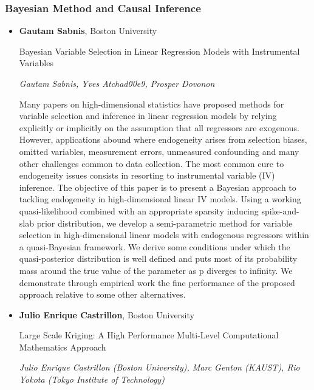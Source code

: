 \subsubsection*{Bayesian Method and Causal Inference}

\begin{itemize}
\item \textbf{Gautam Sabnis}, Boston University

Bayesian Variable Selection in Linear Regression Models with Instrumental Variables

\emph{\footnotesize Gautam Sabnis, Yves Atchad\u00e9, Prosper Dovonon}

Many papers on high-dimensional statistics have proposed methods for variable selection and inference in linear regression models by relying explicitly or implicitly on the assumption that all regressors are exogenous. However, applications abound where endogeneity arises from selection biases, omitted variables, measurement errors, unmeasured confounding and many other challenges common to data collection. The most common cure to endogeneity issues consists in resorting to instrumental variable (IV) inference. The objective of this paper is to present a Bayesian approach to tackling endogeneity in high-dimensional linear IV models. Using a working quasi-likelihood combined with an appropriate sparsity inducing spike-and-slab prior distribution, we develop a semi-parametric method for variable selection in high-dimensional linear models with endogenous regressors within a quasi-Bayesian framework. We derive some conditions under which the quasi-posterior distribution is well defined and puts most of its probability mass around the true value of the parameter as p diverges to infinity. We demonstrate through empirical work the fine performance of the proposed approach relative to some other alternatives.

\item \textbf{Julio Enrique Castrillon}, Boston University

Large Scale Kriging: A High Performance Multi-Level Computational Mathematics Approach

\emph{\footnotesize Julio Enrique Castrillon (Boston University),  Marc Genton (KAUST), Rio Yokota (Tokyo Institute of Technology)}


\end{itemize}
